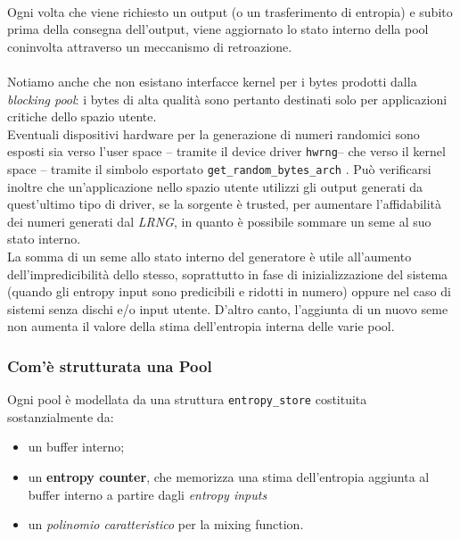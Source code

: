 \documentclass{article}
\begin{document}
 \paragraph{} Ogni volta che viene richiesto un output (o un trasferimento di
 entropia) e subito prima della consegna dell'output, viene aggiornato lo stato
 interno della pool coninvolta attraverso un meccanismo di retroazione.
 
 \paragraph{}Notiamo anche che non esistano interfacce kernel per i bytes
 prodotti dalla \emph{blocking pool}: i bytes di alta qualità sono pertanto destinati
 solo per applicazioni critiche dello spazio utente. \\
 Eventuali dispositivi hardware per la generazione di numeri
 randomici sono esposti sia verso l'user space -- tramite il device driver
 \verb+hwrng+-- che verso il kernel space -- tramite il simbolo esportato 
 \verb+get_random_bytes_arch+ . Può verificarsi inoltre che un'applicazione
 nello spazio utente utilizzi gli output generati da quest'ultimo tipo di
 driver, se la sorgente è trusted, per aumentare l'affidabilità dei numeri
 generati dal \emph{LRNG}, in quanto è possibile sommare un
 seme al suo stato interno.
 \\
 La somma di un seme allo stato interno del generatore è utile all'aumento
 dell'impredicibilità dello stesso, soprattutto in fase di inizializzazione del
 sistema (quando gli entropy input sono predicibili e ridotti in numero) oppure
 nel caso di sistemi senza dischi e/o input utente. D'altro canto, l'aggiunta di
 un nuovo seme non aumenta il valore della stima dell'entropia interna delle
 varie pool.
 \subsubsection{Com'è strutturata una Pool}
 Ogni pool è modellata
 da una struttura \verb+entropy_store+ costituita sostanzialmente da:
 \begin{itemize}
   \item un buffer interno; 
   \item un \textbf{entropy counter}, che memorizza una stima dell'entropia
   aggiunta al buffer interno a partire dagli \emph{entropy inputs}
   \item un \emph{polinomio caratteristico} per la mixing function.
 \end{itemize}
 
\end{document}
